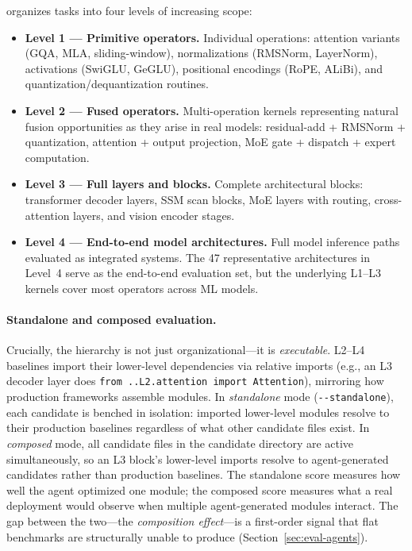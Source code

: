 \fastkernels{} organizes tasks into four levels of increasing scope:

\begin{itemize}[leftmargin=*, itemsep=2pt, topsep=2pt]
\item \textbf{Level 1 --- Primitive operators.}
Individual operations: attention variants (GQA, MLA, sliding-window), normalizations (RMSNorm, LayerNorm), activations (SwiGLU, GeGLU), positional encodings (RoPE, ALiBi), and quantization/dequantization routines.

\item \textbf{Level 2 --- Fused operators.}
Multi-operation kernels representing natural fusion opportunities as they arise in real models: residual-add + RMSNorm + quantization, attention + output projection, MoE gate + dispatch + expert computation.

\item \textbf{Level 3 --- Full layers and blocks.}
Complete architectural blocks: transformer decoder layers, SSM scan blocks, MoE layers with routing, cross-attention layers, and vision encoder stages.

\item \textbf{Level 4 --- End-to-end model architectures.}
Full model inference paths evaluated as integrated systems.
The 47 representative architectures in Level~4 serve as the end-to-end evaluation set, but the underlying L1--L3 kernels cover most operators across ML models.
\end{itemize}

\paragraph{Standalone and composed evaluation.}
Crucially, the hierarchy is not just organizational---it is \emph{executable}.
L2--L4 baselines import their lower-level dependencies via relative imports (e.g., an L3 decoder layer does \texttt{from~..L2.attention~import~Attention}), mirroring how production frameworks assemble modules.
In \emph{standalone} mode (\texttt{-{}-standalone}), each candidate is benched in isolation: imported lower-level modules resolve to their production baselines regardless of what other candidate files exist.
In \emph{composed} mode, all candidate files in the candidate directory are active simultaneously, so an L3 block's lower-level imports resolve to agent-generated candidates rather than production baselines.
The standalone score measures how well the agent optimized one module; the composed score measures what a real deployment would observe when multiple agent-generated modules interact.
The gap between the two---the \emph{composition effect}---is a first-order signal that flat benchmarks are structurally unable to produce (Section~\ref{sec:eval-agents}).

